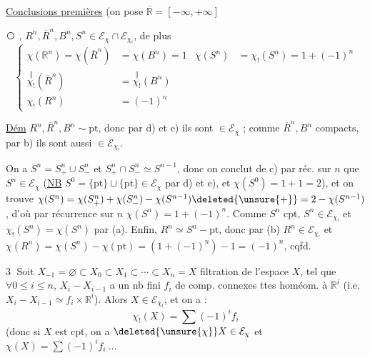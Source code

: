 
\uline{Conclusions premières} (on pose $\overline{\mathbb R}=[-\infty,+\infty]$


\textcircled{}  , $R^n,\overline R^n,B^n,S^n\in\mathcal E_\chi\cap\mathcal E_{\chi_!}$, de plus
\[
\left\{\begin{aligned}
\chi(\mathbb R^n)=\chi(\overline R^n)&=\chi(B^n)=1 & \chi(S^n)&=\chi_!(S^n)=1+(-1)^n\\
\overset{\Vert}{\chi_!}(\overline R^n)&=\overset{\Vert}{\chi_!}(B^n)\\
\chi_!(R^n)&=(-1)^n
\end{aligned}\right.
\]

\uline{Dém} $R^n,\overline R^n,B^n\sim\mathrm{pt}$, donc par d) et e) ils sont $\in\mathcal E_\chi$ ; comme $\overline R^n,B^n$ compacts, par b) ils sont aussi $\in\mathcal E_{\chi_!}$.

On a $S^n=S^n_+\cup S^n_-$ et $S^n_+\cap S^n_-\simeq S^{n-1}$,  donc on conclut de c) par réc. sur $n$ que $S^n\in\mathcal E_\chi$ (\uline{NB} $S^0=\{\mathrm{pt}\}\sqcup\{\mathrm{pt}\}\in\mathcal E_\chi$ par d) et e), et $\chi(S^0)=1+1=2$), et on trouve $\chi(S^n)=\chi(S^n_+)+\chi(S^n_-)-\chi(S^{n-1})\deleted{\unsure{+}}=2-\chi(S^{n-1})$, d'où par récurrence sur $n$ $\chi(S^n)=1+(-1)^n$. Comme $S^n$ cpt, $S^n\in\mathcal E_{\chi_!}$ et $\chi_!(S^n)=\chi(S^n)$ par (a). Enfin, $R^n\simeq S^n-\mathrm{pt}$, donc par (b) $R^n\in\mathcal E_{\chi_!}$ et $\chi(R^n)=\chi(S^n)-\chi(\mathrm{pt})=(1+(-1)^n)-1=(-1)^n$, cqfd.

\textcircled{3} Soit $X_{-1}=\varnothing\subset X_0\subset X_1\subset\cdots\subset X_n=X$ filtration de l'espace $X$, tel que $\forall 0\leq i\leq n$, $X_i-X_{i-1}$  a un nb fini $f_i$ de comp. connexes ttes homéom. à $\mathbb R^i$ (i.e. $X_i-X_{i-1}\simeq f_i\times\mathbb R^i$). Alors $X\in\mathcal E_{\chi_!}$, et on a :
\[
\chi_!(X)=\sum(-1)^i f_i
\]
(donc si $X$ est cpt, on a $\deleted{\unsure{\chi}}X\in\mathcal E_\chi$ et $\chi(X)=\sum(-1)^i f_i\ \ldots$


